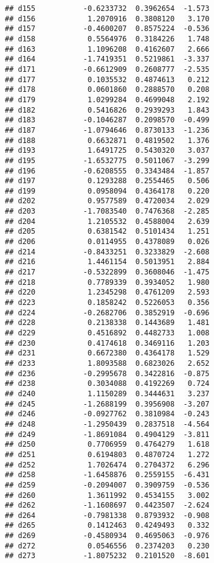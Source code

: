 \documentclass[
]{article}
\begin{document}
\begin{verbatim}
## d155           -0.6233732  0.3962654  -1.573
## d156            1.2070916  0.3808120   3.170
## d157           -0.4600207  0.8575224  -0.536
## d158            0.5564976  0.3184226   1.748
## d163            1.1096208  0.4162607   2.666
## d164           -1.7419351  0.5219861  -3.337
## d171           -0.6612909  0.2608777  -2.535
## d177            0.1035532  0.4874613   0.212
## d178            0.0601860  0.2888570   0.208
## d179            1.0299284  0.4699048   2.192
## d182            0.5416826  0.2939293   1.843
## d183           -0.1046287  0.2098570  -0.499
## d187           -1.0794646  0.8730133  -1.236
## d188            0.6632871  0.4819502   1.376
## d193            1.6491725  0.5430320   3.037
## d195           -1.6532775  0.5011067  -3.299
## d196           -0.6208555  0.3343484  -1.857
## d197            0.1293288  0.2554465   0.506
## d199            0.0958094  0.4364178   0.220
## d202            0.9577589  0.4720034   2.029
## d203           -1.7083540  0.7476368  -2.285
## d204            1.2105532  0.4588004   2.639
## d205            0.6381542  0.5101434   1.251
## d206            0.0114955  0.4378089   0.026
## d214           -0.8433251  0.3233829  -2.608
## d216            1.4461154  0.5013951   2.884
## d217           -0.5322899  0.3608046  -1.475
## d218            0.7789339  0.3934052   1.980
## d220            1.2345298  0.4761209   2.593
## d223            0.1858242  0.5226053   0.356
## d224           -0.2682706  0.3852919  -0.696
## d228            0.2138338  0.1443689   1.481
## d229            0.4516892  0.4482733   1.008
## d230            0.4174618  0.3469116   1.203
## d231            0.6672380  0.4364178   1.529
## d233            1.8093588  0.6823026   2.652
## d236           -0.2995678  0.3422816  -0.875
## d238            0.3034088  0.4192269   0.724
## d240            1.1150289  0.3444631   3.237
## d245           -1.2688199  0.3956908  -3.207
## d246           -0.0927762  0.3810984  -0.243
## d248           -1.2950439  0.2837518  -4.564
## d249           -1.8691084  0.4904129  -3.811
## d250            0.7706959  0.4764279   1.618
## d251            0.6194803  0.4870724   1.272
## d252            1.7026474  0.2704372   6.296
## d258           -1.6458876  0.2559155  -6.431
## d259           -0.2094007  0.3909759  -0.536
## d260            1.3611992  0.4534155   3.002
## d262           -1.1608697  0.4423507  -2.624
## d264           -0.7981338  0.8793932  -0.908
## d265            0.1412463  0.4249493   0.332
## d269           -0.4580934  0.4695063  -0.976
## d272            0.0546556  0.2374203   0.230
## d273           -1.8075232  0.2101520  -8.601

\end{verbatim}
\end{document}
